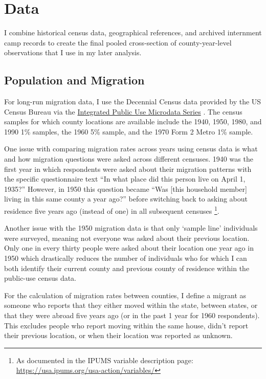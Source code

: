 \documentclass[12pt]{article}
\begin{document}
\section{Data}\label{data}

I combine historical census data, geographical references, and archived internment camp records to create the final pooled cross-section of county-year-level observations that I use in my later analysis. 

\subsection{Population and Migration}\label{population-and-migration}

For long-run migration data, I use the Decennial Census data provided by
the US Census Bureau via the
\href{https://usa.ipums.org/usa/index.shtml}{Integrated Public Use
Microdata Series} \citep{ruggles_ipums_2024}. The census
samples for which county locations are available include the 1940, 1950,
1980, and 1990 1\% samples, the 1960 5\% sample, and the 1970 Form 2
Metro 1\% sample.

One issue with comparing migration rates across years using census data is what and how migration questions were asked across different censuses.
1940 was the first year in which respondents were asked about their migration patterns with the specific questionnaire text
``In what place did this person live on April 1, 1935?''
However, in 1950 this question became
``Was [this household member] living in this same county a year ago?''
before switching back to asking about residence five years ago (instead of one) in all subsequent censuses \footnote{As documented in the IPUMS variable description page: \url{https://usa.ipums.org/usa-action/variables/}}.

Another issue with the 1950 migration data is that only ‘sample line’ individuals were surveyed, meaning not everyone was asked about their previous location.
Only one in every thirty people were asked about their location one year ago
in 1950 which drastically reduces the number of individuals who for which I can both 
identify their current county and previous county of residence within the public-use census data.

For the calculation of migration rates between counties, I define a
migrant as someone who reports that they either moved within the state,
between states, or that they were abroad five years ago (or in the past
1 year for 1960 respondents). This excludes people who report moving
within the same house, didn't report their previous location, or when their
location was reported as unknown.
\end{document}
